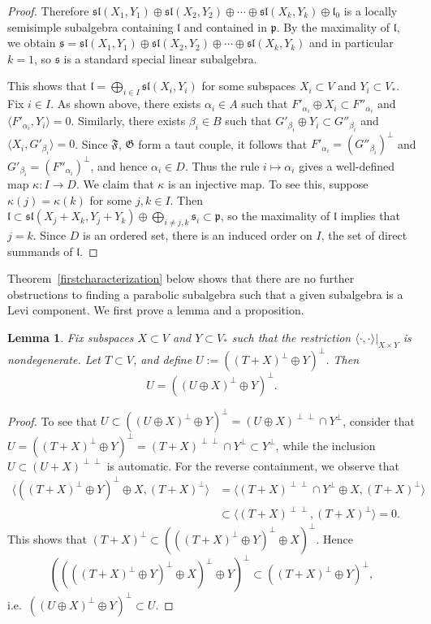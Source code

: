 \documentclass{amsart}
\newtheorem{lemma}[theorem]{Lemma}
\theoremstyle{definition}
\theoremstyle{remark}
\numberwithin{equation}{section}
\def\l{\mathfrak {l}}
\def\p{\mathfrak {p}}
\def\sl{\mathfrak{sl}}
\def\s{\mathfrak{s}}
\def\F{\mathfrak{F}}
\def\G{\mathfrak{G}}
\begin{document}
\begin{proof}
Therefore $\sl(X_1 , Y_1) \oplus \sl(X_2, Y_2) \oplus \cdots \oplus \sl(X_k, Y_k) \oplus \l_0$ is a locally semisimple subalgebra containing $\l$ and contained in $\p$.  By the maximality of $\l$, we obtain $\s = \sl(X_1 , Y_1) \oplus \sl(X_2, Y_2) \oplus \cdots \oplus \sl(X_k, Y_k)$ and in particular $k = 1$, so $\s$ is a standard special linear subalgebra.

This shows that $\l = \bigoplus_{i \in I} \sl (X_i , Y_i)$ for some subspaces $X_i \subset V$ and $Y_i \subset V_*$.  Fix $i \in I$.  As shown above, there exists $\alpha_i \in A$ such that $F'_{\alpha_i} \oplus X_i \subset F''_{\alpha_i}$ and $\langle F'_{\alpha_i} , Y_i \rangle = 0$.  Similarly, there exists $\beta_i \in B$ such that $G'_{\beta_i} \oplus Y_i \subset G''_{\beta_i}$ and $\langle X_i , G'_{\beta_i} \rangle = 0$.  Since $\F$, $\G$ form a taut couple, it follows that $F'_{\alpha_i} = (G''_{\beta_i})^\perp$ and $G'_{\beta_i} = (F''_{\alpha_i})^\perp$, and hence $\alpha_i \in D$.  Thus the rule $i \mapsto \alpha_i$ gives a well-defined map $\kappa : I \rightarrow D$.  We claim that $\kappa$ is an injective map.  To see this, suppose $\kappa (j) = \kappa (k)$ for some $j, k \in I$.  Then $\l \subset \sl (X_j + X_k  , Y_j + Y_k) \oplus \bigoplus_{i \neq j,k} \s_i \subset \p$, so the maximality of $\l$ implies that $j = k$.  Since $D$ is an ordered set, there is an induced order on $I$, the set of direct summands of $\l$.
\end{proof}


Theorem~\ref{firstcharacterization} below shows that there are no further obstructions to finding a parabolic subalgebra such that a given subalgebra is a Levi component.  We first prove a lemma and a proposition.


\begin{lemma} \label{tripleperp}
Fix subspaces $X \subset V$ and $Y \subset V_*$ such that the restriction $\langle \cdot , \cdot \rangle |_{X \times Y}$ is nondegenerate.  Let $T \subset V$, and define $U := ((T + X)^\perp \oplus Y)^\perp$.  Then $$U = ((U \oplus X)^\perp \oplus Y)^\perp.$$
\end{lemma}

\begin{proof}
To see that $U \subset ((U \oplus X)^\perp \oplus Y)^\perp = (U \oplus X)^{\perp \perp} \cap Y^\perp$, consider that $U = ((T + X)^\perp \oplus Y)^\perp = (T + X)^{\perp \perp} \cap Y^\perp \subset Y^\perp$, while the inclusion $U \subset (U + X)^{\perp \perp}$ is automatic.  For the reverse containment, we observe that 
\begin{align*}
\langle ((T + X)^\perp \oplus Y)^\perp \oplus X , (T + X)^\perp \rangle &  =  \langle (T + X)^{\perp \perp} \cap Y^\perp \oplus X , (T + X)^\perp \rangle \\
& \subset \langle (T + X)^{\perp \perp}, (T + X)^\perp \rangle = 0.
\end{align*}
This shows that $(T + X)^\perp \subset (((T + X)^\perp \oplus Y)^\perp \oplus X)^\perp$.  Hence 
$$((((T + X)^\perp \oplus Y)^\perp \oplus X)^\perp \oplus Y)^\perp \subset ((T + X)^\perp \oplus Y)^\perp,$$
i.e.\ $((U \oplus X)^\perp \oplus Y)^\perp \subset U$.
\end{proof}
\end{document}
